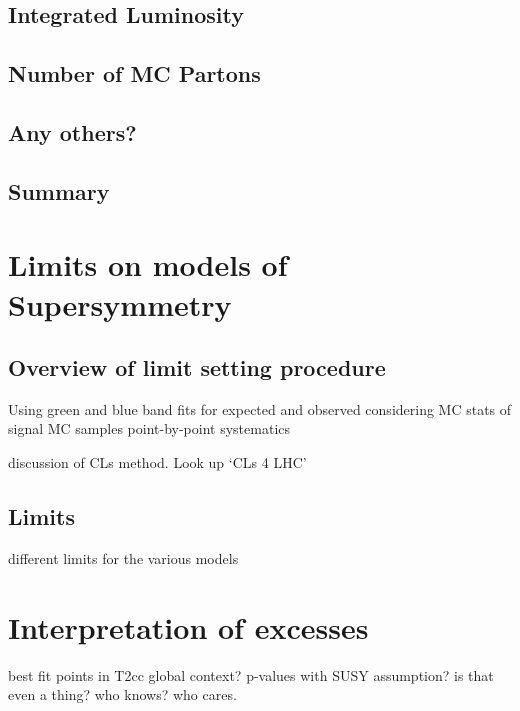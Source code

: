 \subsection{Integrated Luminosity}
\subsection{Number of MC Partons}
\subsection{Any others?}
\subsection{Summary}

\section{Limits on models of Supersymmetry}  %
\label{sec:interpretation_limits}

\subsection{Overview of limit setting procedure}
Using green and blue band fits for expected and observed
considering MC stats of signal MC samples
point-by-point systematics

discussion of CLs method. Look up `CLs 4 LHC'

\subsection{Limits}
different limits for the various models


\section{Interpretation of excesses}
\label{sec:interpretation_excess}
best fit points in T2cc
global context?
p-values with SUSY assumption? is that even a thing? who knows? who cares.
